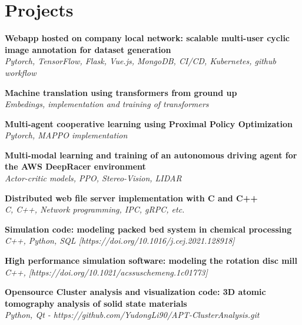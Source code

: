\section{Projects}
\resumeSubHeadingListStart

    \resumeProjectHeading
    {\textbf{Webapp hosted on company local network: scalable multi-user cyclic image annotation for dataset generation} \\
     \emph{Pytorch, TensorFlow, Flask, Vue.js, MongoDB, CI/CD, Kubernetes, github workflow}}    {}

    \resumeProjectHeading
    {\textbf{Machine translation using transformers from ground up} \\
      \emph{Embedings, implementation and training of transformers}}    {}

    \resumeProjectHeading
    {\textbf{Multi-agent cooperative learning using Proximal Policy Optimization} \\
      \emph{Pytorch, MAPPO implementation}}    {}

    \resumeProjectHeading
    {\textbf{Multi-modal learning and training of an autonomous driving agent for the AWS DeepRacer environment} \\
      \emph{Actor-critic models, PPO, Stereo-Vision, LIDAR}}    {}

     \resumeProjectHeading
     {\textbf{Distributed web file server implementation with C and C++} \\
      \emph{C, C++, Network programming, IPC, gRPC, etc.}}    {}
     
    \resumeProjectHeading
    {\textbf{Simulation code: modeling packed bed system in chemical processing} \\
     \emph{C++, Python, SQL [https://doi.org/10.1016/j.cej.2021.128918]}}    {}
    
    \resumeProjectHeading
    {\textbf{High performance simulation software: modeling the rotation disc mill}\\
    \emph{C++, [https://doi.org/10.1021/acssuschemeng.1c01773]}}{}

    \resumeProjectHeading
    {\textbf{Opensource Cluster analysis and visualization code: 3D atomic tomography analysis of solid state materials}\\
    \emph{Python, Qt   - https://github.com/YudongLi90/APT-ClusterAnalysis.git}} 
    

\resumeSubHeadingListEnd